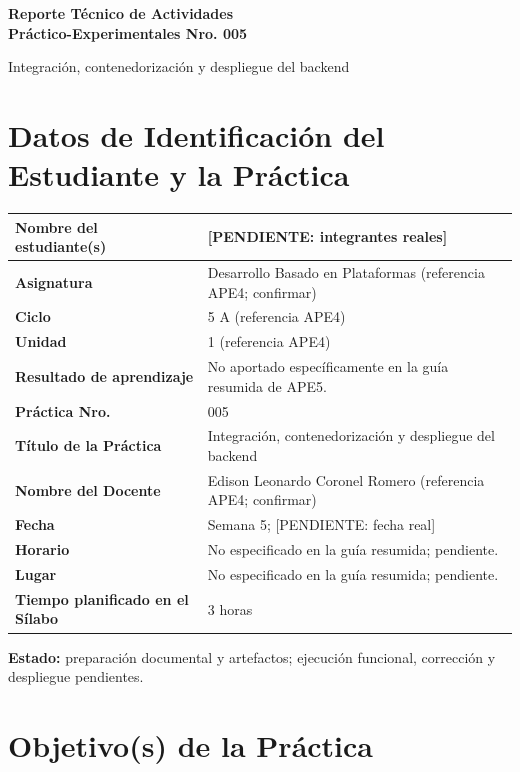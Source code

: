 \documentclass[11pt,a4paper]{article}
\begin{document}
\thispagestyle{fancy}
\begin{center}
{\bfseries\fontsize{21}{24}\selectfont Reporte Técnico de Actividades\\ Práctico-Experimentales Nro. 005\par}
\vspace{0.25cm}
{\large Integración, contenedorización y despliegue del backend}
\end{center}

\section{Datos de Identificación del Estudiante y la Práctica}
\begin{tabularx}{\textwidth}{|L{0.43\textwidth}|Y|}
\hline
\textbf{Nombre del estudiante(s)} & [PENDIENTE: integrantes reales] \\ \hline
\textbf{Asignatura} & Desarrollo Basado en Plataformas (referencia APE4; confirmar) \\ \hline
\textbf{Ciclo} & 5 A (referencia APE4) \\ \hline
\textbf{Unidad} & 1 (referencia APE4) \\ \hline
\textbf{Resultado de aprendizaje} & No aportado específicamente en la guía resumida de APE5. \\ \hline
\textbf{Práctica Nro.} & 005 \\ \hline
\textbf{Título de la Práctica} & Integración, contenedorización y despliegue del backend \\ \hline
\textbf{Nombre del Docente} & Edison Leonardo Coronel Romero (referencia APE4; confirmar) \\ \hline
\textbf{Fecha} & Semana 5; [PENDIENTE: fecha real] \\ \hline
\textbf{Horario} & No especificado en la guía resumida; pendiente. \\ \hline
\textbf{Lugar} & No especificado en la guía resumida; pendiente. \\ \hline
\textbf{Tiempo planificado en el Sílabo} & 3 horas \\ \hline
\end{tabularx}
\textbf{Estado:} preparación documental y artefactos; ejecución funcional, corrección y despliegue pendientes.\par

\section{Objetivo(s) de la
Práctica}\label{APE5-semana-5-objetivos-de-la-pruxe1ctica}
\end{document}
